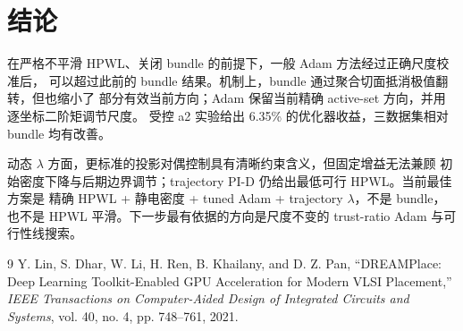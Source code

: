 \documentclass[UTF8,fontset=windows,a4paper,11pt]{ctexart}
\begin{document}
\section{结论}

在严格不平滑 HPWL、关闭 bundle 的前提下，一般 Adam 方法经过正确尺度校准后，
可以超过此前的 bundle 结果。机制上，bundle 通过聚合切面抵消极值翻转，但也缩小了
部分有效当前方向；Adam 保留当前精确 active-set 方向，并用逐坐标二阶矩调节尺度。
受控 a2 实验给出 6.35\% 的优化器收益，三数据集相对 bundle 均有改善。

动态 $\lambda$ 方面，更标准的投影对偶控制具有清晰约束含义，但固定增益无法兼顾
初始密度下降与后期边界调节；trajectory PI-D 仍给出最低可行 HPWL。当前最佳方案是
精确 HPWL + 静电密度 + tuned Adam + trajectory $\lambda$，不是 bundle，也不是
HPWL 平滑。下一步最有依据的方向是尺度不变的 trust-ratio Adam 与可行性线搜索。

\begin{thebibliography}{9}
Y. Lin, S. Dhar, W. Li, H. Ren, B. Khailany, and D. Z. Pan,
``DREAMPlace: Deep Learning Toolkit-Enabled GPU Acceleration for Modern VLSI
Placement,'' \emph{IEEE Transactions on Computer-Aided Design of Integrated
Circuits and Systems}, vol. 40, no. 4, pp. 748--761, 2021.
\end{thebibliography}
\end{document}
